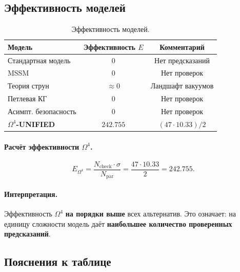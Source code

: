 \documentclass[11pt,a4paper]{article}
\newcommand{\Om}{\Omega^4}
\theoremstyle{definition}
\begin{document}
\subsection{Эффективность моделей}
\label{subsec:benchmark-efficiency}

\begin{table}[htbp]
\centering
\caption{Эффективность моделей.}
\label{tab:benchmark-efficiency}
\begin{tabular}{lcc}
\toprule
Модель & Эффективность $E$ & Комментарий \\
\midrule
Стандартная модель & $0$ & Нет предсказаний \\
MSSM & $0$ & Нет проверок \\
Теория струн & $\approx 0$ & Ландшафт вакуумов \\
Петлевая КГ & $0$ & Нет проверок \\
Асимпт. безопасность & $0$ & Нет проверок \\
\midrule
\textbf{$\Om$-UNIFIED} & $\mathbf{242.755}$ & 
    $(47 \cdot 10.33)/2$ \\
\bottomrule
\end{tabular}
\end{table}

\paragraph{Расчёт эффективности $\Om$.}
\begin{equation}
    E_{\Om} = \frac{N_{\text{check}} \cdot \sigma}{N_{\text{par}}}
    = \frac{47 \cdot 10.33}{2} = 242.755.
\end{equation}

\paragraph{Интерпретация.}
Эффективность $\Om$ \textbf{на порядки выше} всех альтернатив. 
Это означает: на единицу сложности модель даёт 
\textbf{наибольшее количество проверенных предсказаний}.

\subsection{Пояснения к таблице}
\label{subsec:benchmark-comments}
\end{document}
